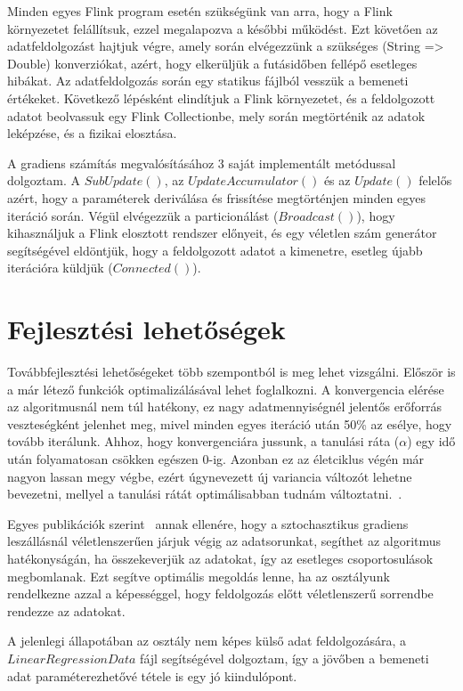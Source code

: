 \documentclass[a4paper,12pt]{article}
\begin{document}
Minden egyes Flink program esetén szükségünk van arra, hogy a Flink környezetet felállítsuk, ezzel megalapozva a későbbi működést. Ezt követően az adatfeldolgozást hajtjuk végre, amely során elvégezzünk a szükséges (String => Double) konverziókat, azért, hogy elkerüljük a futásidőben fellépő esetleges hibákat. Az adatfeldolgozás során egy statikus fájlból vesszük a bemeneti értékeket. Következő lépésként elindítjuk a Flink környezetet, és a feldolgozott adatot beolvassuk egy Flink Collectionbe, mely során megtörténik az adatok leképzése, és a fizikai elosztása. \newline

A gradiens számítás megvalósításához 3 saját implementált metódussal dolgoztam. A $SubUpdate()$, az $UpdateAccumulator()$ és az $Update()$ felelős azért, hogy a paraméterek deriválása és frissítése megtörténjen minden egyes iteráció során. 
Végül elvégezzük a particionálást ($Broadcast()$), hogy kihasználjuk a Flink elosztott rendszer előnyeit, és egy véletlen szám generátor segítségével eldöntjük, hogy a feldolgozott adatot a kimenetre, esetleg újabb iterációra küldjük ($Connected()$).

\section{Fejlesztési lehetőségek}	
Továbbfejlesztési lehetőségeket több szempontból is meg lehet vizsgálni. Először is a már létező funkciók optimalizálásával lehet foglalkozni. A konvergencia elérése az algoritmusnál nem túl hatékony, ez nagy adatmennyiségnél jelentős erőforrás veszteségként jelenhet meg, mivel minden egyes iteráció után 50\% az esélye, hogy tovább iterálunk.
Ahhoz, hogy konvergenciára jussunk, a tanulási ráta ($\alpha$) egy idő után folyamatosan csökken egészen 0-ig. Azonban ez az életciklus végén már nagyon lassan megy végbe, ezért úgynevezett új variancia változót lehetne bevezetni, mellyel a tanulási rátát optimálisabban tudnám változtatni.~\parencite{svrg}.

Egyes publikációk szerint~\parencite{sgd} annak ellenére, hogy a sztochasztikus gradiens leszállásnál véletlenszerűen járjuk végig az adatsorunkat, segíthet az algoritmus hatékonyságán, ha összekeverjük az adatokat, így az esetleges csoportosulások megbomlanak. Ezt segítve optimális megoldás lenne, ha az osztályunk rendelkezne azzal a képességgel, hogy feldolgozás előtt véletlenszerű sorrendbe rendezze az adatokat.

A jelenlegi állapotában az osztály nem képes külső adat feldolgozására, a $LinearRegressionData$ fájl segítségével dolgoztam, így a jövőben a bemeneti adat paraméterezhetővé tétele is egy jó kiindulópont.
\end{document}
